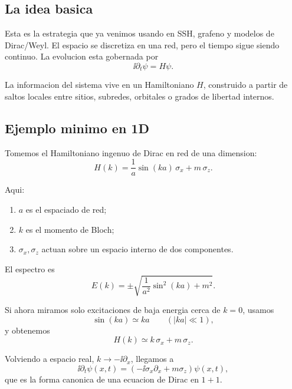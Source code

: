 \subsection{La idea basica}

Esta es la estrategia que ya venimos usando en SSH, grafeno y modelos de Dirac/Weyl. El espacio se discretiza en una red, pero el tiempo sigue siendo continuo. La evolucion esta gobernada por
\begin{equation}
\ii \partial_t \psi = H \psi.
\label{c21:eq:sch-time}
\end{equation}

La informacion del sistema vive en un Hamiltoniano \(H\), construido a partir de saltos locales entre sitios, subredes, orbitales o grados de libertad internos.

\subsection{Ejemplo minimo en 1D}

Tomemos el Hamiltoniano ingenuo de Dirac en red de una dimension:
\begin{equation}
H(k)=\frac{1}{a}\sin(ka)\,\sigma_x + m\,\sigma_z.
\label{c21:eq:lattice-dirac-cont}
\end{equation}

Aqui:

\begin{enumerate}[leftmargin=*]
  \item \(a\) es el espaciado de red;
  \item \(k\) es el momento de Bloch;
  \item \(\sigma_x,\sigma_z\) actuan sobre un espacio interno de dos componentes.
\end{enumerate}

El espectro es
\begin{equation}
E(k)=\pm \sqrt{\frac{1}{a^2}\sin^2(ka)+m^2}.
\end{equation}

Si ahora miramos solo excitaciones de baja energia cerca de \(k=0\), usamos
\begin{equation}
\sin(ka)\simeq ka
\qquad (|ka|\ll 1),
\end{equation}
y obtenemos
\begin{equation}
H(k)\simeq k\,\sigma_x + m\,\sigma_z.
\label{c21:eq:dirac-lowk}
\end{equation}

Volviendo a espacio real, \(k\to -\ii \partial_x\), llegamos a
\begin{equation}
\ii \partial_t \psi(x,t)
=
\left(
-\ii \sigma_x \partial_x + m \sigma_z
\right)\psi(x,t),
\label{c21:eq:dirac-11-cont}
\end{equation}
que es la forma canonica de una ecuacion de Dirac en \(1+1\).

